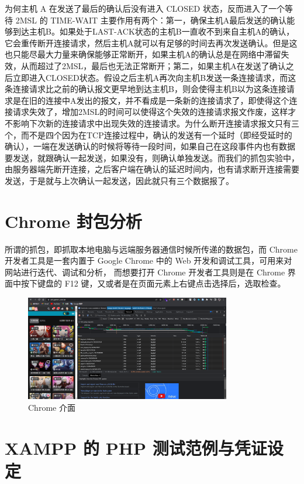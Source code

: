 为何主机 A 在发送了最后的确认后没有进入 CLOSED 状态，反而进入了一个等待 2MSL 的 TIME-WAIT 主要作用有两个：第一，确保主机A最后发送的确认能够到达主机B。如果处于LAST-ACK状态的主机B一直收不到来自主机A的确认，它会重传断开连接请求，然后主机A就可以有足够的时间去再次发送确认。但是这也只能尽最大力量来确保能够正常断开，如果主机A的确认总是在网络中滞留失效，从而超过了2MSL，最后也无法正常断开；第二，如果主机A在发送了确认之后立即进入CLOSED状态。假设之后主机A再次向主机B发送一条连接请求，而这条连接请求比之前的确认报文更早地到达主机B，则会使得主机B以为这条连接请求是在旧的连接中A发出的报文，并不看成是一条新的连接请求了，即使得这个连接请求失效了，增加2MSL的时间可以使得这个失效的连接请求报文作废，这样才不影响下次新的连接请求中出现失效的连接请求。为什么断开连接请求报文只有三个，而不是四个因为在TCP连接过程中，确认的发送有一个延时（即经受延时的确认），一端在发送确认的时候将等待一段时间，如果自己在这段事件内也有数据要发送，就跟确认一起发送，如果没有，则确认单独发送。而我们的抓包实验中，由服务器端先断开连接，之后客户端在确认的延迟时间内，也有请求断开连接需要发送，于是就与上次确认一起发送，因此就只有三个数据报了。

\section{Chrome 封包分析}

所谓的抓包，即抓取本地电脑与远端服务器通信时候所传递的数据包，而 Chrome 开发者工具是一套内置于 Google Chrome 中的 Web 开发和调试工具，可用来对网站进行迭代、调试和分析，
而想要打开 Chrome 开发者工具则是在 Chrome 界面中按下键盘的 F12 键，又或者是在页面元素上右键点击选择后，选取检查。

\begin{figure}[htb]
\centering 
\includegraphics[width=0.80\textwidth]{img/newch1m5.png} 
\caption{Chrome 介面}
\label{Test}
\end{figure}

\section{XAMPP 的 PHP 测试范例与凭证设定}

